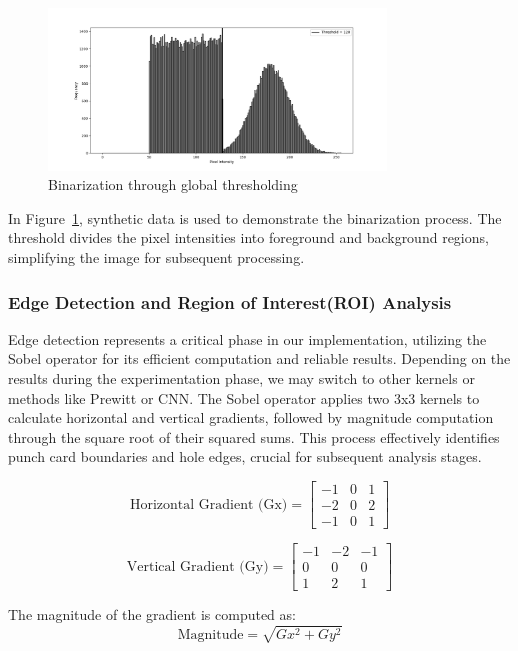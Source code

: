 \begin{figure}[h!]
    \centering
    \includegraphics[width=0.8\textwidth]{content/images/globalThresholding.png}
    \caption{Binarization through global thresholding}
    \label{fig:globalThresholding}
\end{figure}

In Figure~\ref{fig:globalThresholding}, synthetic data is used to demonstrate the binarization process. The threshold divides the pixel intensities into foreground and background regions, simplifying the image for subsequent processing.

\subsubsection{Edge Detection and Region of Interest(ROI) Analysis}
Edge detection represents a critical phase in our implementation, utilizing the Sobel operator for its efficient computation and reliable results. Depending on the results during the experimentation phase, we may switch to other kernels or methods like Prewitt or CNN. The Sobel operator applies two 3x3 kernels to calculate horizontal and vertical gradients, followed by magnitude computation through the square root of their squared sums. This process effectively identifies punch card boundaries and hole edges, crucial for subsequent analysis stages.

\[
\text{Horizontal Gradient (Gx)} =
\begin{bmatrix}
-1 & 0 & 1 \\
-2 & 0 & 2 \\
-1 & 0 & 1
\end{bmatrix}
\]

\[
\text{Vertical Gradient (Gy)} =
\begin{bmatrix}
-1 & -2 & -1 \\
 0 &  0 &  0 \\
 1 &  2 &  1
\end{bmatrix}
\]

The magnitude of the gradient is computed as:
\[
\text{Magnitude} = \sqrt{Gx^2 + Gy^2}
\]

